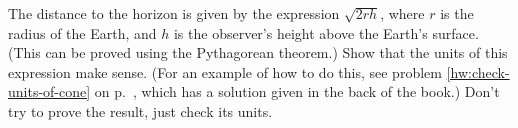 The distance to the horizon is given by the expression $\sqrt{2rh}$, where $r$ is the
radius of the Earth, and $h$ is the observer's height above the Earth's surface. (This can
be proved using the Pythagorean theorem.) Show that the units of this expression make
sense. (For an example of how to do this,
see problem \ref{hw:check-units-of-cone} on p.~\pageref{hw:check-units-of-cone},
which has a solution given in the back of the book.)
Don't try to prove the result, just check its units.
